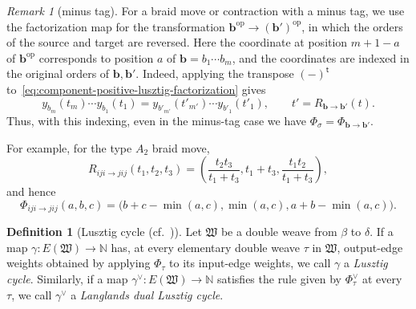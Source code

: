 \documentclass[10pt,a4paper]{article}
\theoremstyle{definition}
\newtheorem{definition}[theorem]{Definition}
\theoremstyle{remark}
\newtheorem{remark}[theorem]{Remark}
\newcommand{\fW}{\mathfrak W}
\begin{document}
\begin{remark}[minus tag]
For a braid move or contraction with a minus tag, we use the factorization map
for the transformation
\(\mathbf b^{\mathrm{op}}\to(\mathbf b')^{\mathrm{op}}\), in which the orders
of the source and target are reversed.  Here the coordinate at position
\(m+1-a\) of \(\mathbf b^{\mathrm{op}}\) corresponds to position \(a\) of
\(\mathbf b=b_1\cdots b_m\), and the coordinates are indexed in the original
orders of \(\mathbf b,\mathbf b'\).  Indeed, applying the transpose
\((-)^{\mathsf t}\) to~\eqref{eq:component-positive-lusztig-factorization}
gives
\[
 y_{b_m}(t_m)\cdots y_{b_1}(t_1)
 =y_{b'_{m'}}(t'_{m'})\cdots y_{b'_1}(t'_1),
 \qquad
 t'=R_{\mathbf b\to\mathbf b'}(t).
\]
Thus, with this indexing, even in the minus-tag case we have
\(\Phi_\sigma=\Phi_{\mathbf b\to\mathbf b'}\).
\end{remark}

For example, for the type \(A_2\) braid move,
\[
 R_{iji\to jij}(t_1,t_2,t_3)
 =\left(
   \frac{t_2t_3}{t_1+t_3},
   t_1+t_3,
   \frac{t_1t_2}{t_1+t_3}
  \right),
\]
and hence
\begin{equation}
 \Phi_{iji\to jij}(a,b,c)
 =\bigl(b+c-\min(a,c),\min(a,c),a+b-\min(a,c)\bigr).
 \label{eq:Phi3}
\end{equation}

\begin{definition}[{Lusztig cycle
  (cf.~\cite[Definition~4.8 and Section~6.1]{CasalsEtAlBraidVarieties})}]
\label{def:lusztig-cycle}
Let \(\fW\) be a double weave from \(\beta\) to \(\delta\).  If a map
\(\gamma:E(\fW)\to\mathbb N\) has, at every elementary double weave \(\tau\)
in \(\fW\), output-edge weights obtained by applying \(\Phi_\tau\) to its
input-edge weights, we call \(\gamma\) a \emph{Lusztig cycle}.  Similarly, if
a map \(\gamma^\vee:E(\fW)\to\mathbb N\) satisfies the rule given by
\(\Phi_\tau^\vee\) at every \(\tau\), we call \(\gamma^\vee\) a
\emph{Langlands dual Lusztig cycle}.
\end{definition}
\end{document}

